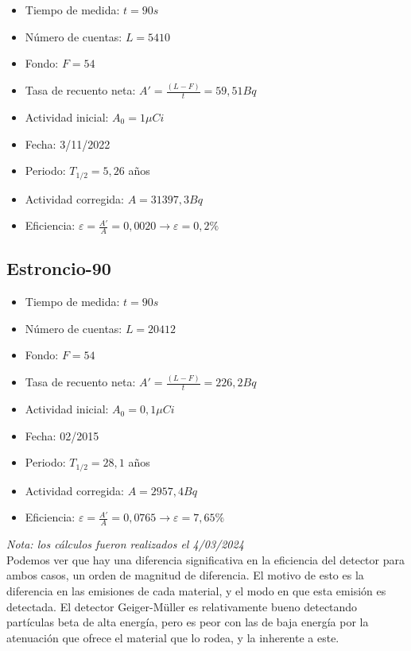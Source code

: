 \documentclass[a4paper,12pt,spanish]{article}
\begin{document}
	
		
	\begin{itemize}
		\item Tiempo de medida: $t = 90\si{s}$
		\item Número de cuentas: $L = 5410$ 
		\item Fondo: $F = 54$
		\item Tasa de recuento neta: $A' = \frac{(L- F)}{t} = 59,51\si{Bq} $
		\item Actividad inicial: $A_0 = 1\si{\mu Ci}$
		\item Fecha: 3/11/2022
		\item Periodo: $T_{1/2} = 5,26$ años
		\item Actividad corregida: $A = 31397,3\si{Bq}$ 
		\item Eficiencia: $\varepsilon = \frac{A'}{A} = 0,0020 \longrightarrow \varepsilon = 0,2\%$  
	\end{itemize}
	
	\subsection*{Estroncio-90}  %
	
	
	
	\begin{itemize}
		\item Tiempo de medida: $t = 90\si{s}$
		\item Número de cuentas: $L = 20412$ 
		\item Fondo: $F = 54$
		\item Tasa de recuento neta: $A' = \frac{(L- F)}{t} = 226,2\si{Bq} $
		\item Actividad inicial: $A_0 = 0,1\si{\mu Ci}$
		\item Fecha: 02/2015
		\item Periodo: $T_{1/2} = 28,1$ años
		\item Actividad corregida: $A = 2957,4\si{Bq}$ 
		\item Eficiencia: $\varepsilon = \frac{A'}{A} = 0,0765 \longrightarrow \varepsilon = 7,65\%$  
	\end{itemize}
	
	\textit{Nota: los cálculos fueron realizados el 4/03/2024}\\
	
	Podemos ver que hay una diferencia significativa en la eficiencia del detector para ambos casos, un orden de magnitud de diferencia. El motivo de esto es la diferencia en las emisiones de cada material, y el modo en que esta emisión es detectada. El detector Geiger-Müller es relativamente bueno detectando partículas beta de alta energía, pero es peor con las de baja energía por la atenuación que ofrece el material que lo rodea, y la inherente a este. \\
	
\end{document}
